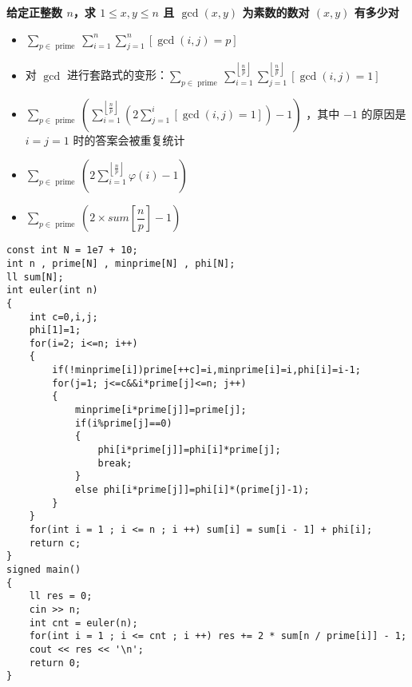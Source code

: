 \documentclass[E:/GsjzTle/main/main.tex]{subfiles}
\begin{document}
\textbf{给定正整数 \(n\)，求 \(1\le x,y\le n\) 且 \(\gcd(x,y)\)
为素数的数对 \((x,y)\) 有多少对}

\begin{itemize}
\item
  \(
  \sum_{p \in \text { prime }} \sum_{i=1}^{n} \sum_{j=1}^{n}[\operatorname{gcd}(i, j)=p]
  \)
\item
  对 \(\gcd\) 进行套路式的变形：\(
  \sum_{p \in \text { prime }} \sum_{i=1}^{\left\lfloor\frac{n}{p}\right\rfloor} \sum_{j=1}^{\left\lfloor\frac{n}{p}\right\rfloor}[\operatorname{gcd}(i, j)=1
 ]\)
\item
  \(
  \sum_{p \in \text { prime }}\left(\sum_{i=1}^{\left\lfloor\frac{n}{p}\right\rfloor}\left(2 \sum_{j=1}^{i}[\operatorname{gcd}(i, j)=1]\right)-1\right)
  \) ，其中 \(-1\) 的原因是 \(i=j=1\) 时的答案会被重复统计
\item
  \(
  \sum_{p \in \text { prime }}\left(2 \sum_{i=1}^{\left\lfloor\frac{n}{p}\right\rfloor} \varphi(i)-1\right)
 \)
\item
  \(\sum_{p \in \text { prime }}\left(2 × sum\left[ \dfrac{n}{p}\right] -1\right)
 \)
\end{itemize}

\begin{lstlisting}
const int N = 1e7 + 10;
int n , prime[N] , minprime[N] , phi[N];
ll sum[N];
int euler(int n)
{
	int c=0,i,j;
	phi[1]=1;
	for(i=2; i<=n; i++)
	{
		if(!minprime[i])prime[++c]=i,minprime[i]=i,phi[i]=i-1;
		for(j=1; j<=c&&i*prime[j]<=n; j++)
		{
			minprime[i*prime[j]]=prime[j];
			if(i%prime[j]==0)
			{
				phi[i*prime[j]]=phi[i]*prime[j];
				break;
			}
			else phi[i*prime[j]]=phi[i]*(prime[j]-1);
		}
	}
	for(int i = 1 ; i <= n ; i ++) sum[i] = sum[i - 1] + phi[i];
	return c;
}
signed main()
{
	ll res = 0;
	cin >> n;
	int cnt = euler(n);
	for(int i = 1 ; i <= cnt ; i ++) res += 2 * sum[n / prime[i]] - 1;
	cout << res << '\n';
	return 0;
}
\end{lstlisting}
\end{document}

